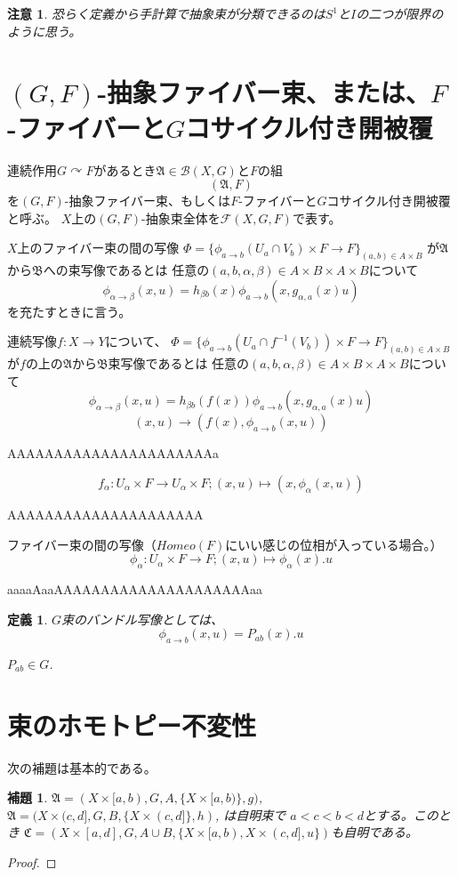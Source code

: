 \documentclass[leqno]{jsarticle}
\newtheorem{lem}[thm]{補題}
\newtheorem{df}[thm]{定義}
\newtheorem*{cau}{注意}
\newcommand{\al}{\alpha}
\begin{document}
\begin{cau}
恐らく定義から手計算で抽象束が分類できるのは$S^1$と$I$の二つが限界のように思う。
\end{cau}

\section{$(G,F)$-抽象ファイバー束、または、$F$-ファイバーと$G$コサイクル付き開被覆}
連続作用$G\curvearrowright F$があるとき$\mathfrak{A}\in \mathscr{B}(X,G)$と$F$の組
\[
(\mathfrak{A}, F)
\]
を$(G,F)$-抽象ファイバー束、もしくは$F$-ファイバーと$G$コサイクル付き開被覆と呼ぶ。
$X$上の$(G,F)$-抽象束全体を$\mathscr{F}(X,G,F)$で表す。

$X$上のファイバー束の間の写像
$\Phi=\{\phi_{a\to b}(U_a\cap V_b)\times F\to F\}_{(a,b)\in A\times B}$
が$\mathfrak{A}$から$\mathfrak{B}$への束写像であるとは
任意の$(a,b,\alpha, \beta)\in A\times B\times A\times B$について
\[
\phi_{\alpha\to \beta}(x,u)=h_{\beta b}(x)\phi_{a\to b}(x, g_{\alpha, a }(x)u)
\]
を充たすときに言う。

連続写像$f:X\to Y$について、
$\Phi=\{\phi_{a\to b}(U_a\cap f^{-1}(V_b))\times F\to F\}_{(a,b)\in A\times B}$
が$f$の上の$\mathfrak{A}$から$\mathfrak{B}$束写像であるとは
任意の$(a,b,\alpha, \beta)\in A\times B\times A\times B$について
\[
\phi_{\alpha\to \beta}(x,u)=h_{\beta b}(f(x))\phi_{a\to b}(x, g_{\alpha, a }(x)u)
\]
\[
(x,u)\to (f(x), \phi_{a\to b}(x,u))
\]


AAAAAAAAAAAAAAAAAAAAAAa

\[
f_{\al}: U_{\al}\times F\to U_{\al}\times F; (x, u)\mapsto (x, \phi_{\al}(x,u))
\]
 
 AAAAAAAAAAAAAAAAAAAAA
 
ファイバー束の間の写像（$Homeo(F)$にいい感じの位相が入っている場合。）
\[
\phi_{\al}:U_{\al}\times F\to F; (x,u)\mapsto \phi_{\al}(x).u
\]

aaaaAaaAAAAAAAAAAAAAAAAAAAAAaa

\begin{df}
$G$束のバンドル写像としては、
\[
\phi_{a\to b}(x, u)=P_{ab}(x).u
\]

$P_{ab}\in G$. 
\end{df}



\section{束のホモトピー不変性}


次の補題は基本的である。
\begin{lem}
$\mathfrak{A}=(X\times [a, b), G, A, \{X\times [a,b)\}, g)$, 
$\mathfrak{A}=(X\times (c,d ], G, B, \{X\times (c,d]\}, h)$, 
は自明束で $a<c<b<d$とする。このとき
$\mathfrak{C}=(X\times [a,d], G, A\cup B, \{X\times[a,b), X\times (c,d], u\})$も自明である。
\end{lem}
\begin{proof}

\end{proof}
\end{document}
